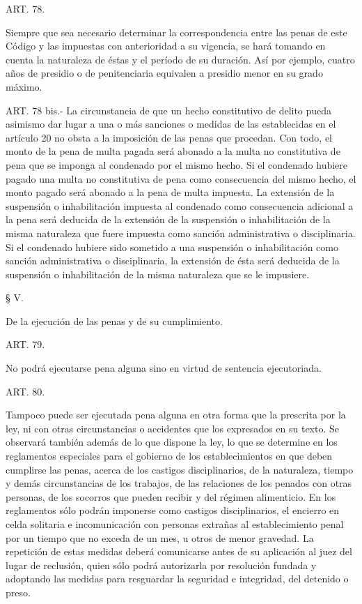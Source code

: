     ART. 78.

    Siempre que sea necesario determinar la correspondencia entre las penas de este Código y las impuestas con anterioridad a su vigencia, se hará tomando en cuenta la naturaleza de éstas y el período de su duración. Así por ejemplo, cuatro años de presidio o de penitenciaria equivalen a presidio menor en su grado máximo.

    ART. 78 bis.-
    La circunstancia de que un hecho constitutivo de delito pueda asimismo dar lugar a una o más sanciones o medidas de las establecidas en el artículo 20 no obsta a la imposición de las penas que procedan.
    Con todo, el monto de la pena de multa pagada será abonado a la multa no constitutiva de pena que se imponga al condenado por el mismo hecho. Si el condenado hubiere pagado una multa no constitutiva de pena como consecuencia del mismo hecho, el monto pagado será abonado a la pena de multa impuesta.     
    La extensión de la suspensión o inhabilitación impuesta al condenado como consecuencia adicional a la pena será deducida de la extensión de la suspensión o inhabilitación de la misma naturaleza que fuere impuesta como sanción administrativa o disciplinaria. Si el condenado hubiere sido sometido a una suspensión o inhabilitación como sanción administrativa o disciplinaria, la extensión de ésta será deducida de la suspensión o inhabilitación de la misma naturaleza que se le impusiere.

    § V.
   
    De la ejecución de las penas y de su cumplimiento.


    ART. 79.

    No podrá ejecutarse pena alguna sino en virtud de sentencia ejecutoriada.


    ART. 80.

    Tampoco puede ser ejecutada pena alguna en otra forma que la prescrita por la ley, ni con otras circunstancias o accidentes que los expresados en su texto.
    Se observará también además de lo que dispone la ley, lo que se determine en los reglamentos especiales para el gobierno de los establecimientos en que deben cumplirse las penas, acerca de los castigos disciplinarios, de la naturaleza, tiempo y demás circunstancias de los trabajos, de las relaciones de los penados con otras personas, de los socorros que pueden recibir y del régimen alimenticio.
    En los reglamentos sólo podrán imponerse como castigos disciplinarios, el encierro en celda solitaria e incomunicación con personas extrañas al establecimiento penal por un tiempo que no exceda de un mes, u otros de menor gravedad.
    La repetición de estas medidas deberá comunicarse antes de su aplicación al juez del lugar de reclusión, quien sólo podrá autorizarla por resolución fundada y adoptando las medidas para resguardar la seguridad e integridad, del detenido o preso.






